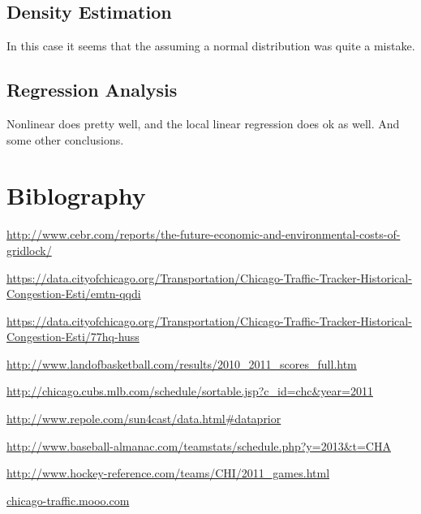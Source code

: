 \documentclass[12pt]{article}
\begin{document}
\subsection{Density Estimation}
In this case it seems that the assuming a normal distribution was quite a mistake. 
\subsection{Regression Analysis}
Nonlinear does pretty well, and the local linear regression does ok as well. And some other conclusions.
\section{Biblography}
\begin{thebibliography}{9}

  \url{http://www.cebr.com/reports/the-future-economic-and-environmental-costs-of-gridlock/}

  \url{https://data.cityofchicago.org/Transportation/Chicago-Traffic-Tracker-Historical-Congestion-Esti/emtn-qqdi}
  
  \url{https://data.cityofchicago.org/Transportation/Chicago-Traffic-Tracker-Historical-Congestion-Esti/77hq-huss}

  \url{http://www.landofbasketball.com/results/2010_2011_scores_full.htm}

  \url{http://chicago.cubs.mlb.com/schedule/sortable.jsp?c_id=chc&year=2011}

  \url{http://www.repole.com/sun4cast/data.html#dataprior}
	
  \url{http://www.baseball-almanac.com/teamstats/schedule.php?y=2013&t=CHA}

  \url{http://www.hockey-reference.com/teams/CHI/2011_games.html}
  
  \url{chicago-traffic.mooo.com}

\end{thebibliography}
\end{document}
